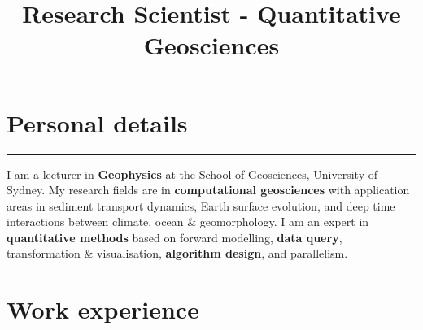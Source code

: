 \documentclass[10pt,a4paper,sans]{moderncv}
\title{Research Scientist - Quantitative Geosciences}
\begin{document}
\makecvtitle
{}
\vspace{-2.5em}

\section{Personal details}



\vspace{0.5em}
{\par\color{color2!50}\rule{\textwidth}{.25ex}\par}
\vspace{0.5em}

I am a lecturer in \textbf{Geophysics} at the School of Geosciences, University of Sydney. My research fields are in \textbf{computational geosciences} with application areas in sediment transport dynamics, Earth surface evolution, and deep time interactions between climate, ocean \& geomorphology. I am an expert in \textbf{quantitative methods} based on forward modelling, \textbf{data query}, transformation \& visualisation, \textbf{algorithm design}, and parallelism.
\vspace{0.5em}

\section{Work experience}
\end{document}
